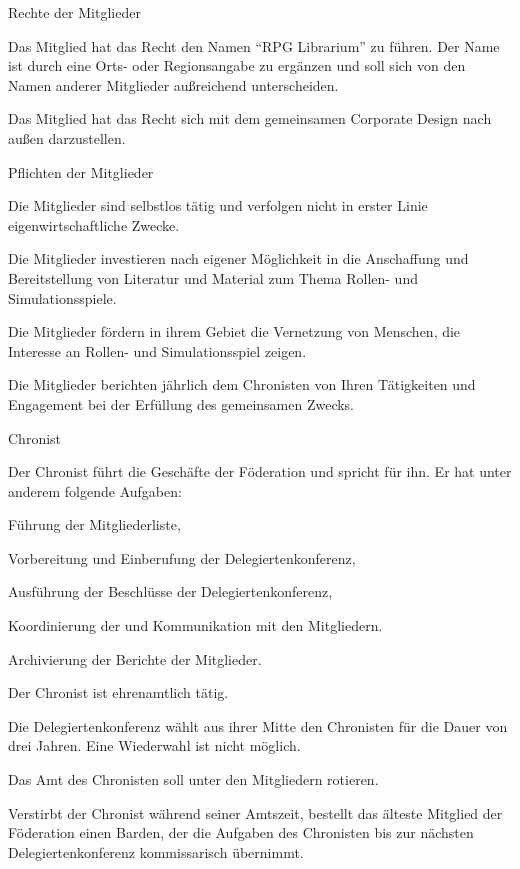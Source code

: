 \documentclass[11pt,a4paper,twoside,openany,article]{memoir}
\begin{document}
\begin{para}{Rechte der Mitglieder}
\label{p:rechte}
\item Das Mitglied hat das Recht den Namen \enquote{RPG Librarium} zu führen. Der Name ist durch eine Orts- oder Regionsangabe zu ergänzen und soll sich von den Namen anderer Mitglieder außreichend unterscheiden.
\item Das Mitglied hat das Recht sich mit dem gemeinsamen Corporate Design nach außen darzustellen.
\end{para}

\begin{para}{Pflichten der Mitglieder}
\label{p:pflichten}
\item Die Mitglieder sind selbstlos tätig und verfolgen nicht in erster Linie eigenwirtschaftliche Zwecke.
\item Die Mitglieder investieren nach eigener Möglichkeit in die Anschaffung und Bereitstellung von Literatur und Material zum Thema Rollen- und Simulationsspiele.
\item Die Mitglieder fördern in ihrem Gebiet die Vernetzung von Menschen, die Interesse an Rollen- und Simulationsspiel zeigen. 
\item Die Mitglieder berichten jährlich dem Chronisten von Ihren Tätigkeiten und Engagement bei der Erfüllung des gemeinsamen Zwecks.
\end{para}

\begin{para}{Chronist}
\label{p:chronist}
\item Der Chronist führt die Geschäfte der Föderation und spricht für ihn. Er hat unter anderem folgende Aufgaben:
    \begin{subpara}
    \item Führung der Mitgliederliste,
    \item Vorbereitung und Einberufung der Delegiertenkonferenz,
    \item Ausführung der Beschlüsse der Delegiertenkonferenz,     
    \item Koordinierung der und Kommunikation mit den Mitgliedern.
    \item Archivierung der Berichte der Mitglieder. 
    \end{subpara}
\item Der Chronist ist ehrenamtlich tätig.
\item Die Delegiertenkonferenz wählt aus ihrer Mitte den Chronisten für die Dauer von drei Jahren. Eine Wiederwahl ist nicht möglich.
\item Das Amt des Chronisten soll unter den Mitgliedern rotieren.
\item Verstirbt der Chronist während seiner Amtszeit, bestellt das älteste Mitglied der Föderation einen Barden, der die Aufgaben des Chronisten bis zur nächsten Delegiertenkonferenz kommissarisch übernimmt.
\end{para}
\end{document}
